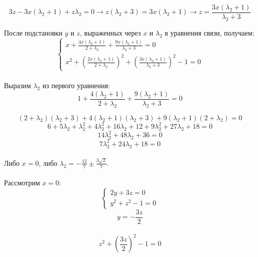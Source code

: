 \documentclass[a5paper, 10pt]{article}
\theoremstyle{definition}
\theoremstyle{plain}
\theoremstyle{remark}
\begin{document}
\begin{equation}
3z -3x(\lambda_2 + 1) + z \lambda_2  = 0 \to z(\lambda_2 + 3) = 3x(\lambda_2 + 1) \to z = \frac{ 3x(\lambda_2 + 1)}{\lambda_2 + 3}
\end{equation}

После подстановки $y$ и $z$, выраженных через $x$ и $\lambda_2$ в уравнения связи, получаем:
\begin{equation}
\begin{cases}
 x + \frac{4x(\lambda_2 + 1)}{2+\lambda_2}+\frac{9x(\lambda_2 + 1)}{\lambda_2 + 3} = 0\\
x^2 +\left(  \frac{2x(\lambda_2 + 1)}{2+\lambda_2} \right)^2+\left( \frac{ 3x(\lambda_2 + 1)}{\lambda_2 + 3} \right)^2 - 1 = 0
\end{cases}
\end{equation}
\\
Выразим $\lambda_2$ из первого уравнения:
\begin{equation}
 1 + \frac{4(\lambda_2 + 1)}{2+\lambda_2}+\frac{9(\lambda_2 + 1)}{\lambda_2 + 3} = 0
\end{equation}

\begin{equation}
 (2+\lambda_2)(\lambda_2 + 3) + 4(\lambda_2 + 1)(\lambda_2 + 3)+9(\lambda_2 + 1) (2+\lambda_2) = 0
\end{equation}
\begin{equation}
 6 + 5\lambda_2 + \lambda_2^2  + 4\lambda_2^2 + 16\lambda_2 + 12+9\lambda_2^2 +27\lambda_2 + 18 = 0
\end{equation}
\begin{equation}
14 \lambda_2^2 + 48  \lambda_2 +36  = 0
\end{equation}
\begin{equation}
7 \lambda_2^2 + 24  \lambda_2 +18  = 0
\end{equation}
 \\
Либо $x=0$, либо $\lambda_2= -\frac{12}{7} \pm \frac{3 \sqrt{2}}{7}$.
\\
\\
Рассмотрим $x = 0$:
\begin{equation}
\begin{cases}
 2y+3z = 0\\
y^2+z^2 - 1 = 0
\end{cases}
\end{equation}
\begin{equation}
y=-\frac{3z}{2}
\end{equation}
\\
\begin{equation}
z^2+\left( \frac{3z}{2} \right)^2 - 1 = 0
\end{equation}
\end{document}
